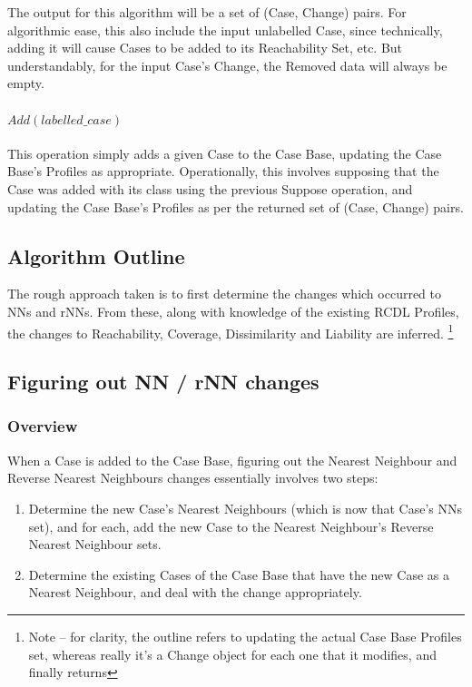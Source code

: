 \documentclass[a4paper,11pt]{report}
\begin{document}
The output for this algorithm will be a set of (Case, Change) pairs. For algorithmic ease, this also include the input unlabelled Case, since technically, adding it will cause Cases to be added to its Reachability Set, etc. But understandably, for the input Case's Change, the Removed data will always be empty.

\paragraph{$Add(labelled\_case)$}
This operation simply adds a given Case to the Case Base, updating the Case Base's Profiles as appropriate. Operationally, this involves supposing that the Case was added with its class using the previous Suppose operation, and updating the Case Base's Profiles as per the returned set of (Case, Change) pairs.

\subsection{Algorithm Outline}
The rough approach taken is to first determine the changes which occurred to NNs and rNNs. From these, along with knowledge of the existing RCDL Profiles, the changes to Reachability, Coverage, Dissimilarity and Liability are inferred. \footnote{Note – for clarity, the outline refers to updating the actual Case Base Profiles set, whereas really it's a Change object for each one that it modifies, and finally returns}

\subsection{Figuring out NN / rNN changes}
\subsubsection{Overview}
When a Case is added to the Case Base, figuring out the Nearest Neighbour and Reverse Nearest Neighbours changes essentially involves two steps:
\begin{enumerate}
	\item Determine the new Case's Nearest Neighbours (which is now that Case's NNs set), and for each, add the new Case to the Nearest Neighbour's Reverse Nearest Neighbour sets.
	\item Determine the existing Cases of the Case Base that have the new Case as a Nearest Neighbour, and deal with the change appropriately.
\end{enumerate}
\end{document}
